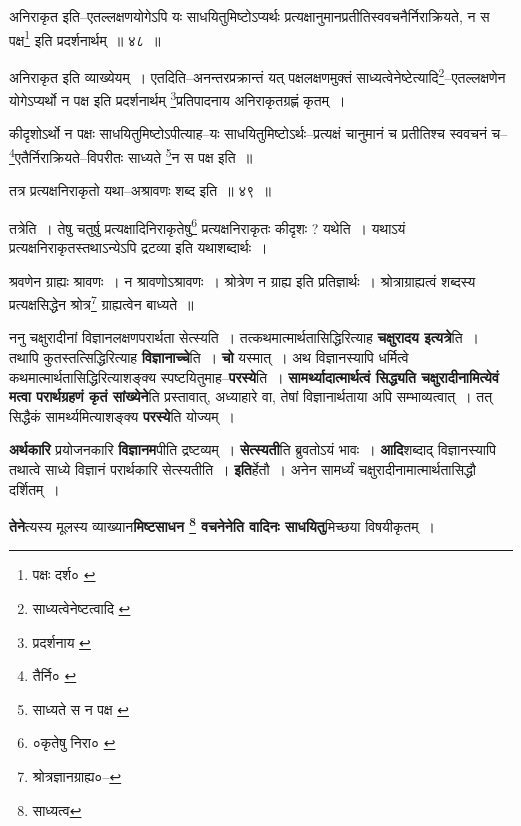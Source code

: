 \documentclass[article,12pt,a4paper]{memoir}
\begin{document}
	  \pstart अनिराकृत इति--एतल्लक्षणयोगेऽपि यः साधयितुमिष्टोऽप्यर्थः प्रत्यक्षानुमानप्रतीतिस्ववचनैर्निराक्रियते, न स पक्ष\footnote{पक्षः दर्श० \cite{dp-msC}} इति प्रदर्शनार्थम् ॥ ४८ ॥
	\pend
      

	  \pstart अनिराकृत इति व्याख्येयम् । एतदिति--अनन्तरप्रक्रान्तं यत् पक्षलक्षणमुक्तं साध्यत्वेनेष्टेत्यादि\footnote{साध्यत्वेनेष्टत्वादि \cite{dp-msC} \cite{dp-msD}}--एतल्लक्षणेन योगेऽप्यर्थो न पक्ष इति प्रदर्शनार्थम् \footnote{प्रदर्शनाय \cite{dp-msA} \cite{dp-msC} \cite{dp-edP} \cite{dp-edH}}प्रतिपादनाय अनिराकृतग्रह्णं कृतम् ।
	\pend
       

	  \pstart कीदृशोऽर्थो न पक्षः साधयितुमिष्टोऽपीत्याह--यः साधयितुमिष्टोऽर्थः--प्रत्यक्षं चानुमानं च प्रतीतिश्च स्ववचनं च--\footnote{तैर्नि० \cite{dp-edE} \cite{dp-edN}}एतैर्निराक्रियते--विपरीतः साध्यते \footnote{साध्यते स न पक्ष \cite{dp-msB} \cite{dp-msD}}न स पक्ष इति ॥
	\pend
       

	  \pstart तत्र प्रत्यक्षनिराकृतो यथा--अश्रावणः शब्द इति ॥ ४९ ॥
	\pend
       

	  \pstart तत्रेति । तेषु चतुर्षु प्रत्यक्षादिनिराकृतेषु\footnote{०कृतेषु निरा० \cite{dp-msB}} प्रत्यक्षनिराकृतः कीदृशः ? यथेति । यथाऽयं प्रत्यक्षनिराकृतस्तथाऽन्येऽपि द्रटव्या इति यथाशब्दार्थः ।
	\pend
       

	  \pstart श्रवणेन ग्राह्यः श्रावणः । न श्रावणोऽश्रावणः । श्रोत्रेण न ग्राह्य इति प्रतिज्ञार्थः । श्रोत्राग्राह्यत्वं शब्दस्य प्रत्यक्षसिद्धेन श्रोत्र\footnote{श्रोत्रज्ञानग्राह्य०--\cite{dp-msD-n}} ग्राह्यत्वेन बाध्यते ॥
	\pend
      

	  \pstart ननु चक्षुरादीनां विज्ञानलक्षणपरार्थता सेत्स्यति । तत्कथमात्मार्थतासिद्धिरित्याह \textbf{चक्षुरादय इत्यत्रे}ति । तथापि कुतस्तत्सिद्धिरित्याह \textbf{विज्ञानाच्चे}ति । \textbf{चो} यस्मात् । अथ विज्ञानस्यापि धर्मित्वे कथमात्मार्थतासिद्धिरित्याशङ्क्य स्पष्टयितुमाह--\textbf{परस्ये}ति । \textbf{सामर्थ्यादात्मार्थत्वं सिद्ध्यति चक्षुरादीनामित्येवं मत्वा परार्थग्रहणं कृतं सांख्येने}ति प्रस्तावात्, अध्याहारे वा, तेषां विज्ञानार्थताया अपि सम्भाव्यत्वात् । तत् सिद्धैकं सामर्थ्यमित्याशङ्क्य \textbf{परस्ये}ति योज्यम् ।
	\pend
      

	  \pstart \textbf{अर्थकारि} प्रयोजनकारि \textbf{विज्ञानम}पीति द्रष्टव्यम् । \textbf{सेत्स्यती}ति ब्रुवतोऽयं भावः । \textbf{आदि}शब्दाद् विज्ञानस्यापि तथात्वे साध्ये विज्ञानं परार्थकारि सेत्स्यतीति । \textbf{इति}र्हेतौ । अनेन सामर्ध्यं चक्षुरादीनामात्मार्थतासिद्धौ दर्शितम् ।
	\pend
      

	  \pstart \textbf{तेने}त्यस्य मूलस्य व्याख्यान\textbf{मिष्टसाधन \footnote{साध्यत्व} वचनेनेति वादिनः साधयितु}मिच्छया विषयीकृतम् ।
	\pend
      
\end{document}
